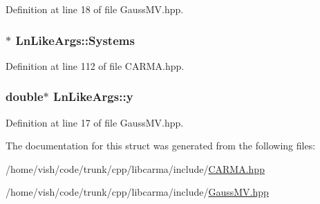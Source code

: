 Definition at line 18 of file Gauss\-M\-V.\-hpp.

\hypertarget{struct_ln_like_args_af605bb6dcb409ad41dfc1a00c1e12c3f}{
\subsubsection[{Systems}]{$\ast$ Ln\-Like\-Args\-::\-Systems}}\label{struct_ln_like_args_af605bb6dcb409ad41dfc1a00c1e12c3f}


Definition at line 112 of file C\-A\-R\-M\-A.\-hpp.

\hypertarget{struct_ln_like_args_a49e48f13e6203cf7f629d3485416874f}{
\subsubsection[{y}]{\setlength{\rightskip}{0pt plus 5cm}double$\ast$ Ln\-Like\-Args\-::y}}\label{struct_ln_like_args_a49e48f13e6203cf7f629d3485416874f}


Definition at line 17 of file Gauss\-M\-V.\-hpp.



The documentation for this struct was generated from the following files\-:\begin{DoxyCompactItemize}
\item 
/home/vish/code/trunk/cpp/libcarma/include/\hyperlink{_c_a_r_m_a_8hpp}{C\-A\-R\-M\-A.\-hpp}\item 
/home/vish/code/trunk/cpp/libcarma/include/\hyperlink{_gauss_m_v_8hpp}{Gauss\-M\-V.\-hpp}\end{DoxyCompactItemize}

